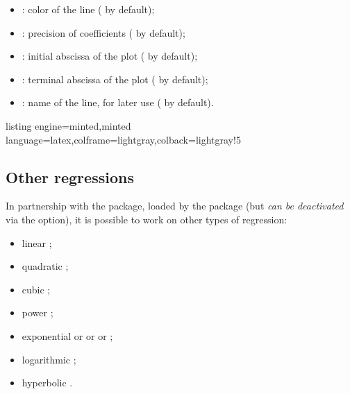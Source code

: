 \documentclass[11pt,a4paper]{ltxdoc}
\begin{document}
\begin{itemize}
	\item {}: color of the line ( by default);
	\item {}: precision of coefficients ( by default);
	\item {}: initial abscissa of the plot ( by default);
	\item {}: terminal abscissa of the plot ( by default);
	\item {}: name of the line, for later use ( by default).
\end{itemize}

\begin{tcblisting}{listing engine=minted,minted language=latex,colframe=lightgray,colback=lightgray!5}
\begin{GraphTikz}%
	[x=0.075cm,y=0.03cm,Xmin=0,Xmax=160,Xgrid=20,Xgrids=10,
	Origy=250,Ymin=250,Ymax=400,Ygrid=25,Ygrids=5]
\end{GraphTikz}
\end{tcblisting}

\subsection{Other regressions}\label{regressions}

In partnership with the  package, loaded by the package (but \textit{can be deactivated} via the \MontreCode{[noxintreg]} option), it is possible to work on other types of regression:

\begin{itemize}
	\item linear ;
	\item quadratic ;
	\item cubic ;
	\item power ;
	\item exponential  or  or  or ;
	\item logarithmic ;
	\item hyperbolic  .
\end{itemize}
\end{document}
